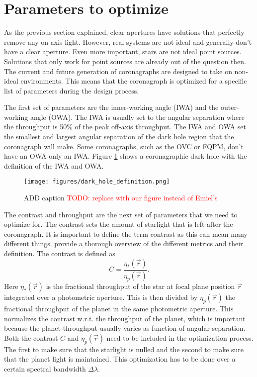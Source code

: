 \documentclass[letterpaper]{ar-1col}
\begin{document}
\section{Parameters to optimize}
As the previous section explained, clear apertures have solutions that perfectly remove any on-axis light. However, real systems are not ideal and generally don't have a clear aperture. Even more important, stars are not ideal point sources. Solutions that only work for point sources are already out of the question then. The current and future generation of coronagraphs are designed to take on non-ideal environments. This means that the coronagraph is optimized for a specific list of parameters during the design process.

The first set of parameters are the inner-working angle (IWA) and the outer-working angle (OWA). The IWA is usually set to the angular separation where the throughput is 50\% of the peak off-axis throughput. The IWA and OWA set the smallest and largest angular separation of the dark hole region that the coronagraph will make. Some coronagraphs, such as the OVC or FQPM, don't have an OWA only an IWA. Figure \ref{fig:coronagraph_focal_plane_definitions} shows a coronagraphic dark hole with the definition of the IWA and OWA.

\begin{figure}[ht]
  \centering
  \texttt{[image: figures/dark\_hole\_definition.png]}
  \caption{ADD caption \textcolor{red}{TODO: replace with our figure instead of Emiel's}}
  \label{fig:coronagraph_focal_plane_definitions}
\end{figure}

The contrast and throughput are the next set of parameters that we need to optimize for. The contrast sets the amount of starlight that is left after the coronagraph. It is important to define the term contrast as this can mean many different things. \citeauthor{ruane2018review} provide a thorough overview of the different metrics and their definition. The contrast is defined as
\begin{equation}
C = \frac{\eta_*(\vec{r})}{\eta_p(\vec{r})}.
\end{equation}
Here $\eta_*(\vec{r})$ is the fractional throughput of the star at focal plane position $\vec{r}$ integrated over a photometric aperture. This is then divided by $\eta_p(\vec{r})$ the fractional throughput of the planet in the same photometric aperture. This normalizes the contrast w.r.t. the throughput of the planet, which is important because the planet throughput usually varies as function of angular separation. Both the contrast $C$ and $\eta_p(\vec{r})$ need to be included in the optimization process. The first to make sure that the starlight is nulled and the second to make sure that the planet light is maintained. This optimization has to be done over a certain spectral bandwidth $\Delta \lambda$.
\end{document}
